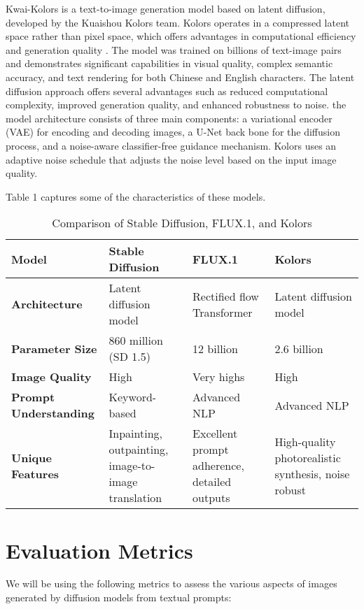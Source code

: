 \documentclass{article}
\begin{document}
Kwai-Kolors is a text-to-image generation model based on latent diffusion, developed by the Kuaishou Kolors team. 
Kolors operates in a compressed latent space rather than pixel space, 
which offers advantages in computational efficiency and generation quality \cite{kolors2024}. The model was trained on billions of text-image 
pairs and demonstrates significant capabilities in visual quality, complex semantic accuracy, and text rendering for both 
Chinese and English characters. The latent diffusion approach offers several advantages such as reduced computational complexity, improved 
generation quality, and enhanced robustness to noise. the model architecture consists of three main components: a variational encoder 
(VAE) for encoding and decoding images, a U-Net back bone for the diffusion process, and a noise-aware classifier-free guidance 
mechanism. Kolors uses an 
adaptive noise schedule that adjusts the noise level based on the input image quality.

Table 1 captures some of the characteristics of these models.

\begin{table}
  \centering
  \begin{tabular}{p{1.5in} p{1.5in} p{1.5in} p{1.5in}}
    \toprule
    \textbf{Model} & \textbf{Stable Diffusion} & \textbf{FLUX.1} & \textbf{Kolors} \\
    \midrule
    \textbf{Architecture} & Latent diffusion model & Rectified flow Transformer & Latent diffusion model \\
    \textbf{Parameter Size} & 860 million (SD 1.5) & 12 billion & 2.6 billion \\
    \textbf{Image Quality} & High & Very highs & High \\
    \textbf{Prompt Understanding} & Keyword-based & Advanced NLP & Advanced NLP \\
    \textbf{Unique Features} &
    Inpainting, outpainting, image-to-image translation & Excellent prompt adherence, detailed outputs & High-quality photorealistic synthesis, noise robust \\
    \bottomrule
  \end{tabular}
  \label{tab:comparison}
  \caption{Comparison of Stable Diffusion, FLUX.1, and Kolors}
\end{table}

\section{Evaluation Metrics}
We will be using the following metrics to assess the various aspects of images generated by diffusion models from textual prompts:
\end{document}
